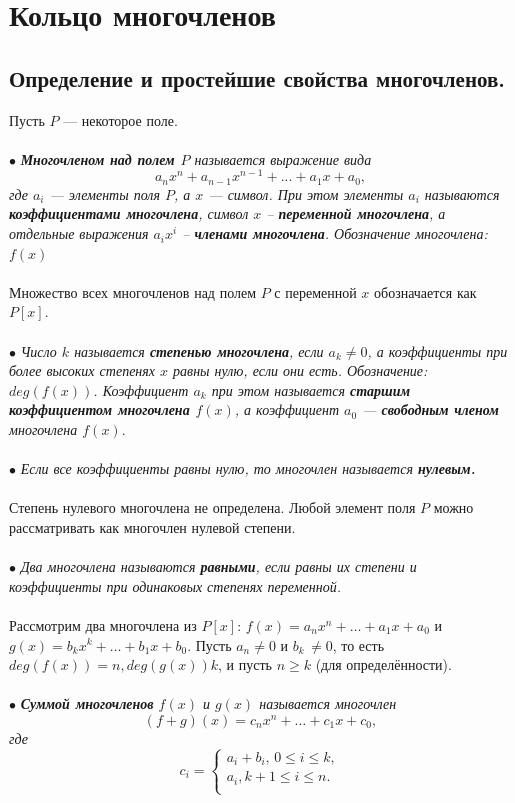 \chapter{Кольцо многочленов}
\section{Определение и простейшие свойства многочленов.}
Пусть $P$ --- некоторое поле.\\\\ 
$\bullet$ \textit{\textbf{Многочленом над полем $P$} называется выражение вида $$a_nx^n + a_{n-1}x^{n-1}
	+...+ a_1x + a_0,$$ где $a_i$ --- элементы поля $P$, а $x$ --- символ. При этом элементы $a_i$ называются
	\textbf{коэффициентами многочлена}, символ $x$ – \textbf{переменной многочлена}, а отдельные
	выражения $a_ix^i$
	– \textbf{членами многочлена}. Обозначение многочлена: $f(x)$}\\\\
Множество всех многочленов над полем $P$ с переменной $x$ обозначается как $P[x]$.\\\\
$\bullet$ \textit{Число $k$ называется \textbf{степенью многочлена}, если $a_k \not= 0$, а коэффициенты при более
	высоких степенях $x$ равны нулю, если они есть. Обозначение: $deg(f(x))$. Коэффициент $a_k$ при этом называется \textbf{старшим коэффициентом многочлена $f(x)$}, а коэффициент $a_0$ --- \textbf{свободным членом} 
	многочлена $f(x)$}.\\\\
$\bullet$ \textit{Если все коэффициенты равны нулю, то многочлен называется \textbf{нулевым.}}\\\\ Степень нулевого 
многочлена не определена. Любой элемент поля $P$ можно рассматривать как многочлен нулевой 
степени.\\\\
$\bullet$ \textit{Два многочлена называются\textbf{ равными}, если равны их степени и коэффициенты при 
	одинаковых степенях переменной.}\\\\
Рассмотрим два многочлена из $P[x]$: $f(x) = a_nx^n
+ \ldots + a_1x + a_0$ и $g(x) = b_kx^k
+ \ldots + b_1x + b_0$. Пусть $a_n\ne0$ и $b_k \, \not= 0$, то есть $deg (f(x)) = n, deg(g(x)) k$,
и пусть $n \geqslant k$ (для определённости).\\\\
$\bullet $ \textit{\textbf{Суммой многочленов} $f(x)$ и $g(x)$ называется многочлен $$(f+g)(x)= c_nx^n + … + c_1x + c_0,$$ 
	где $$c_i= \begin{cases}
		a_i+b_i, \, 0 \leqslant i \leqslant k,\\
		a_i, k+1 \leqslant i \leqslant n.\\
	\end{cases}$$}\\\\
